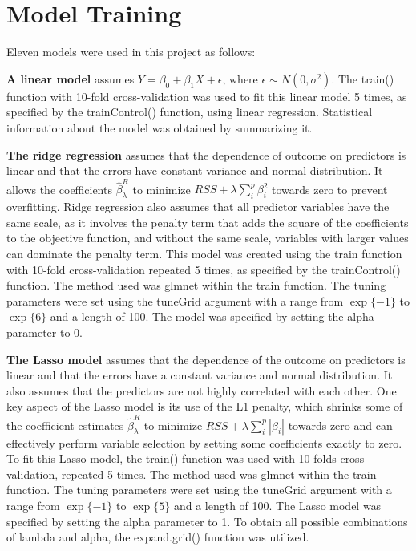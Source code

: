 \documentclass[
]{article}
\begin{document}
\hypertarget{model-training}{%
\section{Model Training}\label{model-training}}

Eleven models were used in this project as follows:

\textbf{A linear model} assumes \(Y=\beta_0+\beta_1X+\epsilon\), where
\(\epsilon\sim N(0,\sigma^2).\) The train() function with 10-fold
cross-validation was used to fit this linear model 5 times, as specified
by the trainControl() function, using linear regression. Statistical
information about the model was obtained by summarizing it.

\textbf{The ridge regression} assumes that the dependence of outcome on
predictors is linear and that the errors have constant variance and
normal distribution. It allows the coefficients \(\hat\beta^R_\lambda\)
to minimize \(RSS+\lambda\sum_i^p\beta_i^2\) towards zero to prevent
overfitting. Ridge regression also assumes that all predictor variables
have the same scale, as it involves the penalty term that adds the
square of the coefficients to the objective function, and without the
same scale, variables with larger values can dominate the penalty term.
This model was created using the train function with 10-fold
cross-validation repeated 5 times, as specified by the trainControl()
function. The method used was glmnet within the train function. The
tuning parameters were set using the tuneGrid argument with a range from
\(\exp\{-1\}\) to \(\exp\{6\}\) and a length of 100. The model was
specified by setting the alpha parameter to 0.

\textbf{The Lasso model} assumes that the dependence of the outcome on
predictors is linear and that the errors have a constant variance and
normal distribution. It also assumes that the predictors are not highly
correlated with each other. One key aspect of the Lasso model is its use
of the L1 penalty, which shrinks some of the coefficient estimates
\(\hat\beta^R_\lambda\) to minimize \(RSS+\lambda\sum_i^p|\beta_i|\)
towards zero and can effectively perform variable selection by setting
some coefficients exactly to zero. To fit this Lasso model, the train()
function was used with 10 folds cross validation, repeated 5 times. The
method used was glmnet within the train function. The tuning parameters
were set using the tuneGrid argument with a range from \(\exp\{-1\}\) to
\(\exp\{5\}\) and a length of 100. The Lasso model was specified by
setting the alpha parameter to 1. To obtain all possible combinations of
lambda and alpha, the expand.grid() function was utilized.
\end{document}
